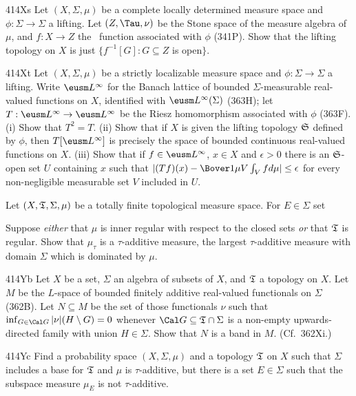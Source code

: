 {\spheader 414Xs Let $(X,\Sigma,\mu)$ be a complete locally determined
measure space and $\phi:\Sigma\to\Sigma$ a lifting.   Let $(Z,\Tau,\nu)$
be the Stone space of the measure algebra of $\mu$, and $f:X\to Z$ the
\imp\ function associated with $\phi$ (341P).   Show that the lifting
topology on $X$ is just $\{f^{-1}[G]:G\subseteq Z$ is open$\}$.

\spheader 414Xt Let $(X,\Sigma,\mu)$ be a strictly localizable measure
space and $\phi:\Sigma\to\Sigma$ a lifting.   Write $\eusm L^{\infty}$
for the Banach lattice of bounded $\Sigma$-measurable real-valued
functions on $X$, identified with $\eusm L^{\infty}(\Sigma)$ (363H);
let $T:\eusm L^{\infty}\to\eusm L^{\infty}$ be the Riesz homomorphism
associated with $\phi$ (363F).   (i) Show that $T^2=T$.  (ii) Show that
if $X$ is given the lifting topology $\frak S$ defined by $\phi$, then
$T[\eusm L^{\infty}]$ is precisely the space of bounded continuous
real-valued functions on $X$.   (iii) Show that if
$f\in\eusm L^{\infty}$, $x\in X$ and $\epsilon>0$ there is an
$\frak S$-open set $U$ containing $x$ such that
$|(Tf)(x)-\Bover1{\mu V}\int_Vfd\mu|\le\epsilon$ for every
non-negligible measurable set $V$ included in $U$.

Let $(X,\frak T,\Sigma,\mu)$ be a totally finite topological
measure space.   For $E\in\Sigma$ set


\noindent Suppose {\it either} that $\mu$ is inner regular with respect
to the closed sets {\it or} that $\frak T$ is regular.   Show that
$\mu_{\tau}$ is a $\tau$-additive measure, the
largest $\tau$-additive measure with domain $\Sigma$ which is dominated
by $\mu$.

\spheader 414Yb Let $X$ be a set, $\Sigma$ an algebra of subsets of $X$,
and $\frak T$ a topology on $X$.   Let $M$ be the $L$-space of bounded
finitely additive real-valued functionals on $\Sigma$ (362B).   Let
$N\subseteq M$ be the set of those functionals $\nu$ such that
$\inf_{G\in\Cal G}|\nu|(H\setminus G)=0$ whenever
$\Cal G\subseteq\frak T\cap\Sigma$ is a non-empty upwards-directed
family with union
$H\in\Sigma$.   Show that $N$ is a band in $M$.   (Cf.\ 362Xi.)

\spheader 414Yc Find a probability space $(X,\Sigma,\mu)$ and a topology
$\frak T$ on $X$ such that $\Sigma$ includes a base for $\frak T$ and
$\mu$ is $\tau$-additive, but there is a set $E\in\Sigma$ such that the
subspace measure $\mu_E$ is not $\tau$-additive.

}

